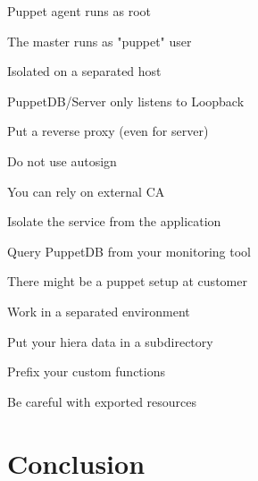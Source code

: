 \begin{iframe}[Security]
\item Puppet agent runs as root
\item The master runs as "puppet" user
\item Isolated on a separated host
\item PuppetDB/Server only listens to Loopback
\item Put a reverse proxy (even for server)
\end{iframe}

\begin{iframe}
\item Do not use autosign
\item You can rely on external CA
\item Isolate the service from the application
\item Query PuppetDB from your monitoring tool
\end{iframe}



\begin{iframe}
\item There might be a puppet setup at customer
\item Work in a separated environment
\item Put your hiera data in a subdirectory
\item Prefix your custom functions
\item Be careful with exported resources
\end{iframe}

\section{Conclusion}


